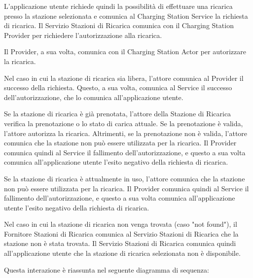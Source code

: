 L'applicazione utente richiede quindi la possibilità di effettuare una ricarica presso la stazione selezionata e comunica al Charging Station Service la richiesta di ricarica. Il Servizio Stazioni di Ricarica comunica con il Charging Station Provider per richiedere l'autorizzazione alla ricarica.

Il Provider, a sua volta, comunica con il Charging Station Actor per autorizzare la ricarica.

Nel caso in cui la stazione di ricarica sia libera, l'attore comunica al Provider il successo della richiesta. Questo, a sua volta, comunica al Service il successo dell'autorizzazione, che lo comunica all'applicazione utente.

Se la stazione di ricarica è già prenotata, l'attore della Stazione di Ricarica verifica la prenotazione o lo stato di carica attuale. Se la prenotazione è valida, l'attore autorizza la ricarica. Altrimenti, se la prenotazione non è valida, l'attore comunica che la stazione non può essere utilizzata per la ricarica. Il Provider comunica quindi al Service il fallimento dell'autorizzazione, e questo a sua volta comunica all'applicazione utente l'esito negativo della richiesta di ricarica.

Se la stazione di ricarica è attualmente in uso, l'attore comunica che la stazione non può essere utilizzata per la ricarica. Il Provider comunica quindi al Service il fallimento dell'autorizzazione, e questo a sua volta comunica all'applicazione utente l'esito negativo della richiesta di ricarica.

Nel caso in cui la stazione di ricarica non venga trovata (caso "not found"), il Fornitore Stazioni di Ricarica comunica al Servizio Stazioni di Ricarica che la stazione non è stata trovata. Il Servizio Stazioni di Ricarica comunica quindi all'applicazione utente che la stazione di ricarica selezionata non è disponibile.

Questa interazione è riassunta nel seguente diagramma di sequenza:

